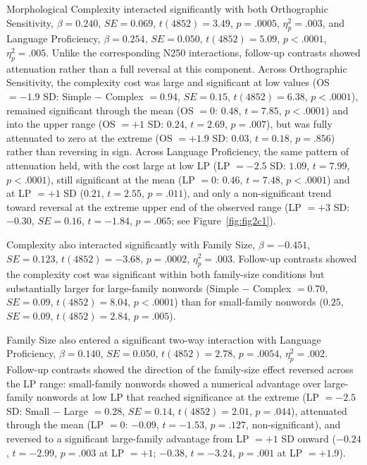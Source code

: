 \documentclass[utf8]{FrontiersinHarvard} %
\begin{document}
	Morphological Complexity interacted significantly with both Orthographic Sensitivity, $\beta = 0.240$, $SE = 0.069$, $t(4852) = 3.49$, $p = .0005$, $\eta^2_p = .003$, and Language Proficiency, $\beta = 0.254$, $SE = 0.050$, $t(4852) = 5.09$, $p < .0001$, $\eta^2_p = .005$. Unlike the corresponding N250 interactions, follow-up contrasts showed attenuation rather than a full reversal at this component. Across Orthographic Sensitivity, the complexity cost was large and significant at low values (OS $= -1.9$ SD: Simple $-$ Complex $= 0.94$, $SE = 0.15$, $t(4852) = 6.38$, $p < .0001$), remained significant through the mean (OS $= 0$: $0.48$, $t = 7.85$, $p < .0001$) and into the upper range (OS $= +1$ SD: $0.24$, $t = 2.69$, $p = .007$), but was fully attenuated to zero at the extreme (OS $= +1.9$ SD: $0.03$, $t = 0.18$, $p = .856$) rather than reversing in sign. Across Language Proficiency, the same pattern of attenuation held, with the cost large at low LP (LP $= -2.5$ SD: $1.09$, $t = 7.99$, $p < .0001$), still significant at the mean (LP $= 0$: $0.46$, $t = 7.48$, $p < .0001$) and at LP $= +1$ SD ($0.21$, $t = 2.55$, $p = .011$), and only a non-significant trend toward reversal at the extreme upper end of the observed range (LP $= +3$ SD: $-0.30$, $SE = 0.16$, $t = -1.84$, $p = .065$; see Figure~\ref{fig:fig2c1}).

	Complexity also interacted significantly with Family Size, $\beta = -0.451$, $SE = 0.123$, $t(4852) = -3.68$, $p = .0002$, $\eta^2_p = .003$. Follow-up contrasts showed the complexity cost was significant within both family-size conditions but substantially larger for large-family nonwords (Simple $-$ Complex $= 0.70$, $SE = 0.09$, $t(4852) = 8.04$, $p < .0001$) than for small-family nonwords ($0.25$, $SE = 0.09$, $t(4852) = 2.84$, $p = .005$).

	Family Size also entered a significant two-way interaction with Language Proficiency, $\beta = 0.140$, $SE = 0.050$, $t(4852) = 2.78$, $p = .0054$, $\eta^2_p = .002$. Follow-up contrasts showed the direction of the family-size effect reversed across the LP range: small-family nonwords showed a numerical advantage over large-family nonwords at low LP that reached significance at the extreme (LP $= -2.5$ SD: Small $-$ Large $= 0.28$, $SE = 0.14$, $t(4852) = 2.01$, $p = .044$), attenuated through the mean (LP $= 0$: $-0.09$, $t = -1.53$, $p = .127$, non-significant), and reversed to a significant large-family advantage from LP $= +1$ SD onward ($-0.24$, $t = -2.99$, $p = .003$ at LP $= +1$; $-0.38$, $t = -3.24$, $p = .001$ at LP $= +1.9$).
\end{document}
